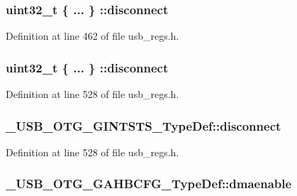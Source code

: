 \hypertarget{group___u_s_b___o_t_g___d_r_i_v_e_r_gadfe594b7e7c5104b684c360b8b7a75cd}{
\subsubsection[{disconnect}]{\setlength{\rightskip}{0pt plus 5cm}uint32\-\_\-t \{ ... \} \-::disconnect}}\label{group___u_s_b___o_t_g___d_r_i_v_e_r_gadfe594b7e7c5104b684c360b8b7a75cd}


Definition at line 462 of file usb\-\_\-regs.\-h.

\hypertarget{group___u_s_b___o_t_g___d_r_i_v_e_r_gade9928a5718383bde36faff82e6653c2}{
\subsubsection[{disconnect}]{\setlength{\rightskip}{0pt plus 5cm}uint32\-\_\-t \{ ... \} \-::disconnect}}\label{group___u_s_b___o_t_g___d_r_i_v_e_r_gade9928a5718383bde36faff82e6653c2}


Definition at line 528 of file usb\-\_\-regs.\-h.

\hypertarget{group___u_s_b___o_t_g___d_r_i_v_e_r_gaa4d5b02c9b36bed21a2fecaa2de3f680}{
\subsubsection[{disconnect}]{ \-\_\-\-U\-S\-B\-\_\-\-O\-T\-G\-\_\-\-G\-I\-N\-T\-S\-T\-S\-\_\-\-Type\-Def\-::disconnect}}\label{group___u_s_b___o_t_g___d_r_i_v_e_r_gaa4d5b02c9b36bed21a2fecaa2de3f680}


Definition at line 528 of file usb\-\_\-regs.\-h.

\hypertarget{group___u_s_b___o_t_g___d_r_i_v_e_r_gaa752eec03f809fffd6f0f46f34b5752d}{
\subsubsection[{dmaenable}]{ \-\_\-\-U\-S\-B\-\_\-\-O\-T\-G\-\_\-\-G\-A\-H\-B\-C\-F\-G\-\_\-\-Type\-Def\-::dmaenable}}\label{group___u_s_b___o_t_g___d_r_i_v_e_r_gaa752eec03f809fffd6f0f46f34b5752d}


